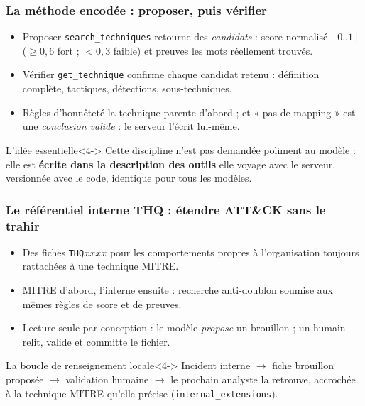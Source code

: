 \documentclass[aspectratio=169,11pt]{beamer}
\begin{document}
\begin{frame}
  \frametitle{La méthode encodée : proposer, puis vérifier}
  \vspace{0.15cm}
  \begin{itemize}\setlength\itemsep{0.45em}
    \item Proposer \texttt{search\_techniques} retourne des
      \emph{candidats} : score normalisé $[0..1]$ ($\geq 0{,}6$ fort ;
      $< 0{,}3$ faible) et preuves les mots réellement trouvés.
    \item<2-> Vérifier \texttt{get\_technique} confirme chaque
      candidat retenu : définition complète, tactiques, détections,
      sous-techniques.
    \item<3-> Règles d'honnêteté  la technique parente d'abord ;
      et « pas de mapping » est une \emph{conclusion valide} : le serveur
      l'écrit lui-même.
  \end{itemize}
  \vspace{0.3cm}
  \begin{block}{L'idée essentielle}<4->
    Cette discipline n'est pas demandée poliment au modèle : elle est
    \textbf{écrite dans la description des outils} elle voyage avec le
    serveur, versionnée avec le code, identique pour tous les modèles.
  \end{block}
\end{frame}
 
\begin{frame}
  \frametitle{Le référentiel interne THQ : étendre ATT\&CK sans le trahir}
  \vspace{0.15cm}
  \begin{itemize}\setlength\itemsep{0.45em}
    \item Des fiches \texttt{THQ}$xxxx$ pour les comportements propres à
      l'organisation toujours rattachées à une technique MITRE.
    \item<2-> MITRE d'abord, l'interne ensuite : recherche anti-doublon
      soumise aux mêmes règles de score et de preuves.
    \item<3-> Lecture seule par conception : le modèle \emph{propose}
      un brouillon ; un humain relit, valide et committe le fichier.
  \end{itemize}
  \vspace{0.3cm}
  \begin{exampleblock}{La boucle de renseignement locale}<4->
    Incident interne $\rightarrow$ fiche brouillon proposée $\rightarrow$
    validation humaine $\rightarrow$ le prochain analyste la retrouve,
    accrochée à la technique MITRE qu'elle précise
    (\texttt{internal\_extensions}).
  \end{exampleblock}
\end{frame}
 
\end{document}
